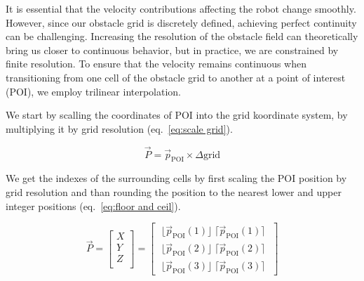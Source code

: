 \documentclass[letterpaper, 10 pt, conference]{ieeeconf}  %
\begin{document}
It is essential that the velocity contributions affecting the robot change smoothly. However, since our obstacle grid is discretely defined, achieving perfect continuity can be challenging. Increasing the resolution of the obstacle field can theoretically bring us closer to continuous behavior, but in practice, we are constrained by finite resolution. To ensure that the velocity remains continuous when transitioning from one cell of the obstacle grid to another at a point of interest (POI), we employ trilinear interpolation. 

We start by scalling the coordinates of POI into the grid koordinate system, by multiplying it by grid resolution (eq.~\ref{eq:scale grid}). 

\begin{equation}
	\label{eq:scale grid}
	\vec{P} = \vec{p}_{\mathrm{POI}} \times\Delta \mathrm{grid}
\end{equation}

We get the indexes of the surrounding cells by first scaling the POI position by grid resolution and than rounding the position to the nearest lower and upper integer positions (eq.~\ref{eq:floor and ceil}).

%
%

\begin{equation}
	\label{eq:floor and ceil}
	\vec{P} =
	\begin{bmatrix}
		X \\
		Y \\
		Z \\
	\end{bmatrix}
	=
	\begin{bmatrix}
		\; \lfloor \vec{p}_{\mathrm{POI}}(1) \rfloor \; \lceil \vec{p}_{\mathrm{POI}}(1) \rceil \;  \\
		\; \lfloor \vec{p}_{\mathrm{POI}}(2) \rfloor \; \lceil \vec{p}_{\mathrm{POI}}(2) \rceil \; \\
		\; \lfloor \vec{p}_{\mathrm{POI}}(3) \rfloor \; \lceil \vec{p}_{\mathrm{POI}}(3) \rceil \; 
	\end{bmatrix}
\end{equation}
\end{document}
